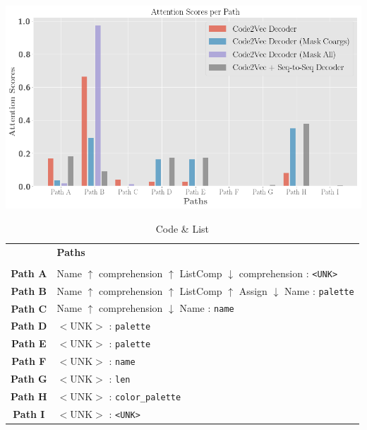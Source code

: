 \begin{table}[ht!]
\begin{center}

\includegraphics[width=0.9\linewidth]{ImagesCodeRelated/pretty_attention_XKCD.png}
\begingroup
    \fontsize{10pt}{12pt}\selectfont
\begin{tabular}{c l}
    & \textbf{Paths} \\
    \\
    \textbf{Path A} & Name $\uparrow$ comprehension $\uparrow$ ListComp $\downarrow$ comprehension : \texttt{<UNK>} \\
    \textbf{Path B} & Name $\uparrow$ comprehension $\uparrow$ ListComp $\uparrow$ Assign $\downarrow$ Name : \texttt{palette} \\
    \textbf{Path C} & Name $\uparrow$ comprehension $\downarrow$ Name : \texttt{name} \\
    \textbf{Path D} & $<$UNK$>$ : \texttt{palette} \\
    \textbf{Path E} & $<$UNK$>$ : \texttt{palette} \\
    \textbf{Path F} & $<$UNK$>$ : \texttt{name} \\
    \textbf{Path G} & $<$UNK$>$ : \texttt{len} \\
    \textbf{Path H} & $<$UNK$>$ : \texttt{color_palette} \\
    \textbf{Path I} & $<$UNK$>$ : \texttt{<UNK>} \\
\end{tabular}
\endgroup


\end{center}
\caption{Code \& List}
\label{fig:single_examples}
\end{table}



